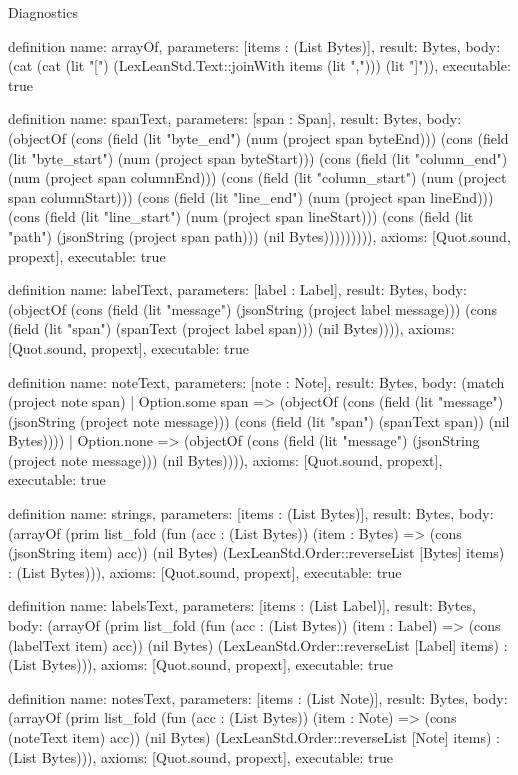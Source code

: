\begin{lexlean}{Diagnostics}
\begin{semanticmodule}
definition{
  name: arrayOf,
  parameters: [items : (List Bytes)],
  result: Bytes,
  body: (cat (cat (lit "[") (LexLeanStd.Text::joinWith items (lit ","))) (lit "]")),
  executable: true
}

definition{
  name: spanText,
  parameters: [span : Span],
  result: Bytes,
  body: (objectOf (cons (field (lit "byte_end") (num (project span byteEnd))) (cons (field (lit "byte_start") (num (project span byteStart))) (cons (field (lit "column_end") (num (project span columnEnd))) (cons (field (lit "column_start") (num (project span columnStart))) (cons (field (lit "line_end") (num (project span lineEnd))) (cons (field (lit "line_start") (num (project span lineStart))) (cons (field (lit "path") (jsonString (project span path))) (nil Bytes))))))))),
  axioms: [Quot.sound, propext],
  executable: true
}

definition{
  name: labelText,
  parameters: [label : Label],
  result: Bytes,
  body: (objectOf (cons (field (lit "message") (jsonString (project label message))) (cons (field (lit "span") (spanText (project label span))) (nil Bytes)))),
  axioms: [Quot.sound, propext],
  executable: true
}

definition{
  name: noteText,
  parameters: [note : Note],
  result: Bytes,
  body: (match (project note span)
    | Option.some span => (objectOf (cons (field (lit "message") (jsonString (project note message))) (cons (field (lit "span") (spanText span)) (nil Bytes))))
    | Option.none => (objectOf (cons (field (lit "message") (jsonString (project note message))) (nil Bytes)))),
  axioms: [Quot.sound, propext],
  executable: true
}

definition{
  name: strings,
  parameters: [items : (List Bytes)],
  result: Bytes,
  body: (arrayOf (prim list_fold (fun (acc : (List Bytes)) (item : Bytes) => (cons (jsonString item) acc)) (nil Bytes) (LexLeanStd.Order::reverseList [Bytes] items) : (List Bytes))),
  axioms: [Quot.sound, propext],
  executable: true
}

definition{
  name: labelsText,
  parameters: [items : (List Label)],
  result: Bytes,
  body: (arrayOf (prim list_fold (fun (acc : (List Bytes)) (item : Label) => (cons (labelText item) acc)) (nil Bytes) (LexLeanStd.Order::reverseList [Label] items) : (List Bytes))),
  axioms: [Quot.sound, propext],
  executable: true
}

definition{
  name: notesText,
  parameters: [items : (List Note)],
  result: Bytes,
  body: (arrayOf (prim list_fold (fun (acc : (List Bytes)) (item : Note) => (cons (noteText item) acc)) (nil Bytes) (LexLeanStd.Order::reverseList [Note] items) : (List Bytes))),
  axioms: [Quot.sound, propext],
  executable: true
}


\end{semanticmodule}
\end{lexlean}
